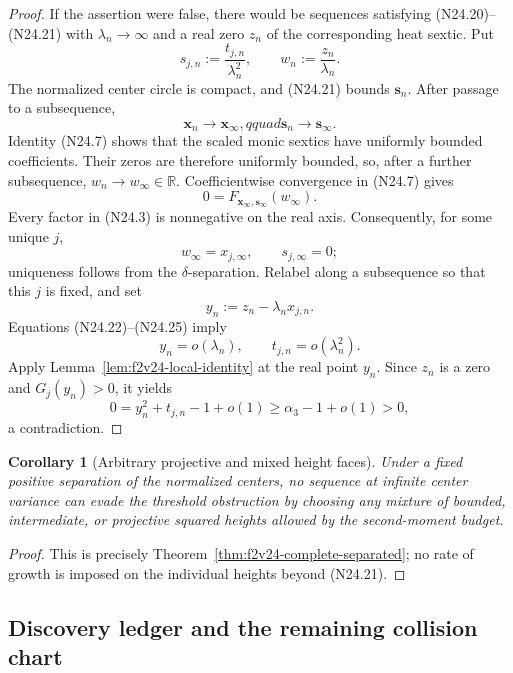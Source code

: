 \documentclass[11pt]{article}
\newtheorem{corollary}[theorem]{Corollary}
\theoremstyle{definition}
\theoremstyle{remark}
\begin{document}
\begin{proof}
If the assertion were false, there would be sequences satisfying
\textup{(N24.20)}--\textup{(N24.21)} with \(\lambda_n\to\infty\) and
a real zero \(z_n\) of the corresponding heat sextic.  Put
\[
 s_{j,n}:=\frac{t_{j,n}}{\lambda_n^2},
 \qquad w_n:=\frac{z_n}{\lambda_n}.
 \tag{N24.22}
\]
The normalized center circle is compact, and \textup{(N24.21)} bounds
\(\bm s_n\).  After passage to a subsequence,
\[
 \bm x_n\longrightarrow\bm x_\infty,qquad
 \bm s_n\longrightarrow\bm s_\infty.
 \tag{N24.23}
\]
Identity \textup{(N24.7)} shows that the scaled monic sextics have
uniformly bounded coefficients.  Their zeros are therefore uniformly
bounded, so, after a further subsequence, \(w_n\to w_\infty\in\mathbb R\).
Coefficientwise convergence in \textup{(N24.7)} gives
\[
 0=F_{\bm x_\infty,\bm s_\infty}(w_\infty).
 \tag{N24.24}
\]
Every factor in \textup{(N24.3)} is nonnegative on the real axis.
Consequently, for some unique \(j\),
\[
 w_\infty=x_{j,\infty},\qquad s_{j,\infty}=0;
 \tag{N24.25}
\]
uniqueness follows from the \(\delta\)-separation.  Relabel along a
subsequence so that this \(j\) is fixed, and set
\[
 y_n:=z_n-\lambda_nx_{j,n}.
 \tag{N24.26}
\]
Equations \textup{(N24.22)}--\textup{(N24.25)} imply
\[
 y_n=o(\lambda_n),\qquad t_{j,n}=o(\lambda_n^2).
 \tag{N24.27}
\]
Apply Lemma~\ref{lem:f2v24-local-identity} at the real point \(y_n\).
Since \(z_n\) is a zero and \(G_j(y_n)>0\), it yields
\[
 0=y_n^2+t_{j,n}-1+o(1)
 \geq\alpha_3-1+o(1)>0,
 \tag{N24.28}
\]
a contradiction.
\end{proof}

\begin{corollary}[Arbitrary projective and mixed height faces]
\label{cor:f2v24-mixed}
Under a fixed positive separation of the normalized centers, no sequence
at infinite center variance can evade the threshold obstruction by
choosing any mixture of bounded, intermediate, or projective squared
heights allowed by the second-moment budget.
\end{corollary}

\begin{proof}
This is precisely Theorem~\ref{thm:f2v24-complete-separated}; no rate of
growth is imposed on the individual heights beyond
\textup{(N24.21)}.
\end{proof}

\subsection{Discovery ledger and the remaining collision chart}
\label{subsec:f2v24-ledger}
\end{document}
